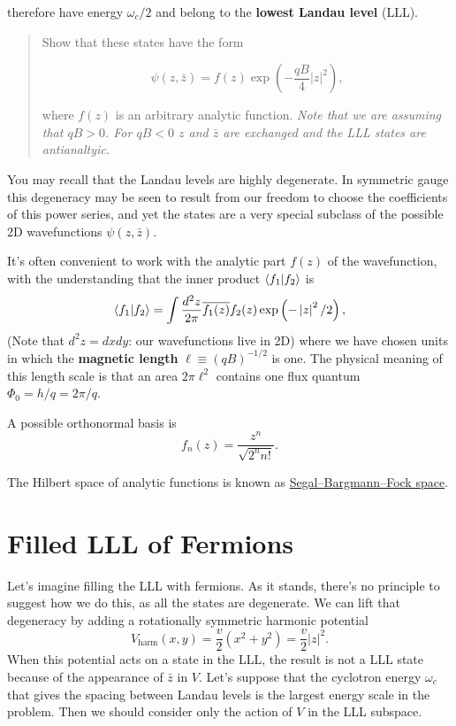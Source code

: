 \documentclass[
  letterpaper,
  DIV=11,
  numbers=noendperiod]{scrreprt}
\begin{document}
therefore have energy \(\omega_c/2\) and belong to the \textbf{lowest
Landau level} (LLL).

\begin{quote}
Show that these states have the form

\[
\psi(z,\bar z) = f(z) \exp\left(-\frac{qB}{4}\left|z\right|^2\right),
\]

where \(f(z)\) is an arbitrary analytic function. \emph{Note that we are
assuming that \(qB>0\). For \(qB<0\) \(z\) and \(\bar z\) are exchanged
and the LLL states are antianaltyic.}
\end{quote}

You may recall that the Landau levels are highly degenerate. In
symmetric gauge this degeneracy may be seen to result from our freedom
to choose the coefficients of this power series, and yet the states are
a very special subclass of the possible 2D wavefunctions
\(\psi(z,\bar z)\).

It's often convenient to work with the analytic part \(f(z)\) of the
wavefunction, with the understanding that the inner product
\(\langle{f_1}\rvert f_2\rangle\) is \[
\label{eq:fb}
\langle{f_1}\rvert f_2\rangle = \int \frac{d^2z}{2\pi} \overline{f_1(z)}f_2(z) \exp\left(-\left|z\right|^2/2\right),
\] (Note that \(d^2z=dx dy\): our wavefunctions live in 2D) where we
have chosen units in which the \textbf{magnetic length}
\(\ell \equiv (qB)^{-1/2}\) is one. The physical meaning of this length
scale is that an area \(2\pi \ell^2\) contains one flux quantum
\(\Phi_0 = h/q=2\pi/q\).

A possible orthonormal basis is \[
f_n(z) = \frac{z^n}{\sqrt{2^n n!}}.
\]

The Hilbert space of analytic functions is known as
\href{https://en.wikipedia.org/wiki/Segal\%E2\%80\%93Bargmann_space}{Segal--Bargmann--Fock
space}.

\section{Filled LLL of Fermions}\label{filled-lll-of-fermions}

Let's imagine filling the LLL with fermions. As it stands, there's no
principle to suggest how we do this, as all the states are degenerate.
We can lift that degeneracy by adding a rotationally symmetric harmonic
potential \[
V_\text{harm}(x,y) = \frac{v}{2}\left(x^2+y^2\right) = \frac{v}{2}\left|z\right|^2.
\label{many_HarmonicRound}
\] When this potential acts on a state in the LLL, the result is not a
LLL state because of the appearance of \(\bar z\) in \(V\). Let's
suppose that the cyclotron energy \(\omega_c\) that gives the spacing
between Landau levels is the largest energy scale in the problem. Then
we should consider only the action of \(V\) in the LLL subspace.
\end{document}
